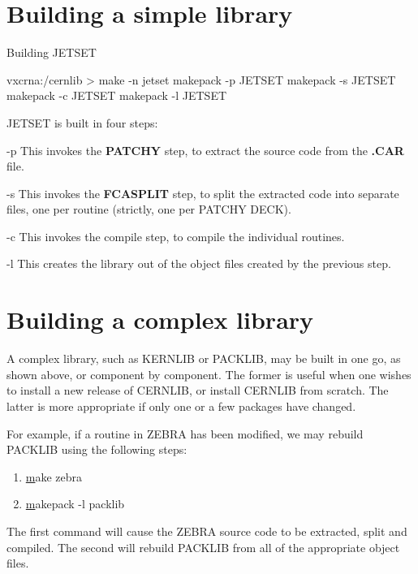 \section{Building a simple library}
\begin{XMPt}{Building JETSET}

vxcrna:/cernlib > make -n jetset 
        makepack -p JETSET 
        makepack -s JETSET 
        makepack -c JETSET 
        makepack -l JETSET 

\end{XMPt}

JETSET is built in four steps:

\begin{DLtt}{12}
\item[-p]This invokes the {\bf PATCHY} step, to extract the 
source code from the {\bf .CAR} file.
\item[-s]This invokes the {\bf FCASPLIT} step, to split the
extracted code into separate files, one per routine (strictly,
one per PATCHY DECK).
\item[-c]This invokes the compile step, to compile the individual
routines.
\item[-l]This creates the library out of the object files created
by the previous step.
\end{DLtt}

\section{Building a complex library}

A complex library, such as KERNLIB or PACKLIB, may be built
in one go, as shown above, or component by component.
The former is useful when one wishes to install a new release
of CERNLIB, or install CERNLIB from scratch. The latter
is more appropriate if only one or a few packages have changed.

For example, if a routine in ZEBRA has been modified, we may
rebuild PACKLIB using the following steps:

\begin{enumerate}
\item
{\underline make zebra}
\item
{\underline makepack -l packlib}
\end{enumerate}

The first command will cause the ZEBRA source code to be extracted,
split and compiled. The second will rebuild PACKLIB from all of the
appropriate object files.

